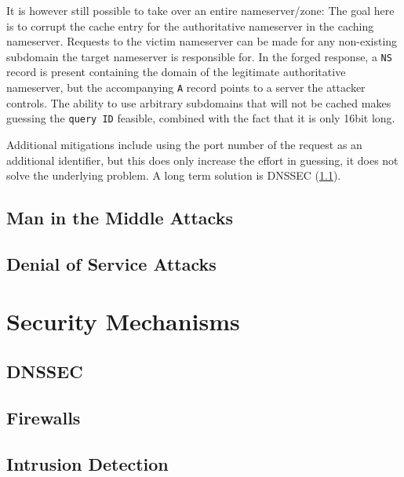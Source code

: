 It is however still possible to take over an entire nameserver/zone: The goal
here is to corrupt the cache entry for the authoritative nameserver in the
caching nameserver. Requests to the victim nameserver can be made for any
non-existing subdomain the target nameserver is responsible for. In the forged
response, a \texttt{NS} record is present containing the domain of the
legitimate authoritative nameserver, but the accompanying \texttt{A} record
points to a server the attacker controls. The ability to use arbitrary
subdomains that will not be cached makes guessing the \texttt{query ID}
feasible, combined with the fact that it is only 16bit long.

Additional mitigations include using the port number of the request as an
additional identifier, but this does only increase the effort in guessing, it
does not solve the underlying problem. A long term solution is DNSSEC
(\cref{sec:dnssec}).


\subsection{Man in the Middle Attacks}

\subsection{Denial of Service Attacks}

\section{Security Mechanisms}

\subsection{DNSSEC}
\label{sec:dnssec}

\subsection{Firewalls}

\subsection{Intrusion Detection}
